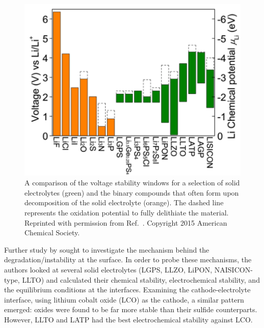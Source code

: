 \documentclass[../main.tex]{subfiles}
\begin{document}
\begin{figure}[H]
    \centering
    \includegraphics[scale=0.45]{figures/zhu2015_electrochemical_windows.png}
    \caption{A comparison of the voltage stability windows for a selection of solid electrolytes (green) and the binary compounds that often form upon decomposition of the solid electrolyte (orange). The dashed line represents the oxidation potential to fully delithiate the material. Reprinted with permission from Ref.~. Copyright 2015 American Chemical Society.}
    \label{fig:se_stab}
\end{figure}

Further study by \citeauthor{Zhu2016} sought to investigate the mechanism behind the degradation/instability at the surface.\cite{Zhu2016} In order to probe these mechanisms, the authors looked at several solid electrolytes (LGPS, LLZO, LiPON, NAISICON-type, LLTO) and calculated their chemical stability, electrochemical stability, and the equilibrium conditions at the interfaces. Examining the cathode-electrolyte interface, using lithium cobalt oxide (LCO) as the cathode, a similar pattern emerged: oxides were found to be far more stable than their sulfide counterparts. However, LLTO and LATP had the best electrochemical stability against LCO.
\end{document}
